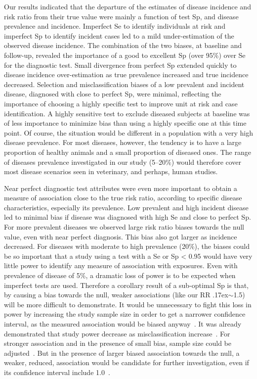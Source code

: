 Our results indicated that the departure of the estimates of disease incidence
and risk ratio from their true value were mainly a function of test Sp, and
disease prevalence and incidence.
Imperfect Se to identify individuals at risk and imperfect Sp to identify
incident cases led to a mild under-estimation of the observed disease incidence.
The combination of the two biases, at baseline and follow-up, revealed the
importance of a good to excellent Sp (over 95\%) over Se for the diagnostic
test.
Small divergence from perfect Sp extended quickly to disease incidence
over-estimation as true prevalence increased and true incidence decreased.
Selection and misclassification biases of a low prevalent and incident
disease, diagnosed with close to perfect Sp, were minimal, reflecting the
importance of choosing a highly specific test to improve unit at risk and case
identification.
A highly sensitive test to exclude diseased subjects at baseline was of less
importance to minimize bias than using a highly specific one at this time point.
Of course, the situation would be different in a population with a very high
disease prevalence.
For most diseases, however, the tendency is to have a large proportion of
healthy animals and a small proportion of diseased ones.
The range of diseases prevalence investigated in our study (5--20\%) would
therefore cover most disease scenarios seen in veterinary, and perhaps, human
studies.

Near perfect diagnostic test attributes were even more important to obtain a
measure of association close to the true risk ratio, according to specific
disease characteristics, especially its prevalence.
Low prevalent and high incident disease led to minimal bias if disease was
diagnosed with high Se and close to perfect Sp.
For more prevalent diseases we observed large risk ratio biases towards the
null value, even with near perfect diagnosis.
This bias also got larger as incidence decreased.
For diseases with moderate to high prevalence (20\%), the biases could be so
important that a study using a test with a Se or Sp < 0.95
would have very little power to identify any measure of association with
exposures.
Even with prevalence of disease of 5\%, a dramatic loss of power is to be
expected when imperfect tests are used.
Therefore a corollary result of a sub-optimal Sp is that, by causing a bias
towards the null, weaker associations (like our RR
\raise.17ex\hbox{$\scriptstyle\sim$}\num{1.5}) will be more difficult to
demonstrate.
It would be unnecessary to fight this loss in power by increasing the study
sample size in order to get a narrower confidence interval, as the measured
association would be biased anyway~\citep{Brenner_1990}.
It was already demonstrated that study power decrease as misclassification
increase~\citep{Brown_2010}.
For stronger association and in the presence of small bias, sample size could be
adjusted~\citep{Dendukuri_2004,Cheng_2009}.
But in the presence of larger biased association towards the null, a weaker,
reduced, association would be candidate for further investigation, even if its
confidence interval include \num{1.0}~\citep{Baird_1991}.


